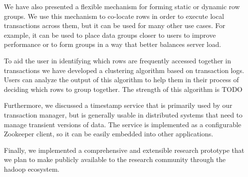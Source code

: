\documentclass[10pt,final,journal]{IEEEtran}
\begin{document}
We have also presented a flexible mechanism for forming static or dynamic row groups. We use this mechanism to co-locate rows in order to execute local transactions across them, but it can be used for many other use cases. For example, it can be used to place data groups closer to users to improve performance or to form groups in a way that better balances server load.

To aid the user in identifying which rows are frequently accessed together in transactions we have developed a clustering algorithm based on transaction logs. Users can analyze the output of this algorithm to help them in their process of deciding which rows to group together. The strength of this algorithm is TODO

Furthermore, we discussed a timestamp service that is primarily used by our transaction manager, but is generally usable in distributed systems that need to manage transient versions of data. The service is implemented as a configurable Zookeeper client, so it can be easily embedded into other applications.

Finally, we implemented a comprehensive and extensible research prototype that we plan to make publicly available to the research community through the hadoop ecosystem.




\end{document}

